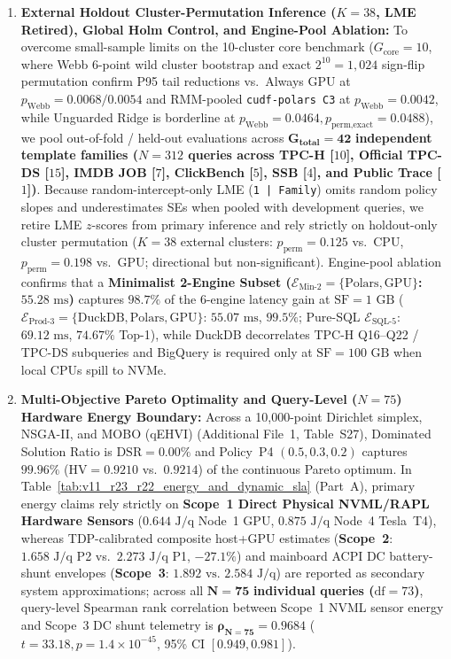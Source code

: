 \documentclass[10pt,a4paper]{article}
\begin{document}
\begin{enumerate}[leftmargin=1.5em,itemsep=1pt]
    \item \textbf{External Holdout Cluster-Permutation Inference ($K=38$, LME Retired), Global Holm Control, and Engine-Pool Ablation:} To overcome small-sample limits on the 10-cluster core benchmark ($G_{\text{core}}=10$, where Webb 6-point wild cluster bootstrap and exact $2^{10}=1{,}024$ sign-flip permutation confirm P95 tail reductions vs.\ Always GPU at $p_{\text{Webb}}=0.0068/0.0054$ and RMM-pooled \texttt{cudf-polars C3} at $p_{\text{Webb}}=0.0042$, while Unguarded Ridge is borderline at $p_{\text{Webb}}=0.0464, p_{\text{perm,exact}}=0.0488$), we pool out-of-fold / held-out evaluations across $\mathbf{G_{\text{total}}=42}$ \textbf{independent template families ($N=312$ queries across TPC-H [$10$], Official TPC-DS [$15$], IMDB JOB [$7$], ClickBench [$5$], SSB [$4$], and Public Trace [$1$])}. Because random-intercept-only LME (\texttt{1 | Family}) omits random policy slopes and underestimates SEs when pooled with development queries, we retire LME $z$-scores from primary inference and rely strictly on holdout-only cluster permutation ($K=38$ external clusters: $p_{\text{perm}} = 0.125$ vs.\ CPU, $p_{\text{perm}} = 0.198$ vs.\ GPU; directional but non-significant). Engine-pool ablation confirms that a \textbf{Minimalist 2-Engine Subset ($\mathcal{E}_{\text{Min-2}}=\{\text{Polars},\text{GPU}\}$: $55.28\text{ ms}$)} captures $\mathbf{98.7\%}$ of the 6-engine latency gain at $\text{SF}=1\text{ GB}$ ($\mathcal{E}_{\text{Prod-3}}=\{\text{DuckDB},\text{Polars},\text{GPU}\}$: $55.07\text{ ms}$, $99.5\%$; Pure-SQL $\mathcal{E}_{\text{SQL-5}}$: $69.12\text{ ms}$, $74.67\%$ Top-1), while DuckDB decorrelates TPC-H Q16--Q22 / TPC-DS subqueries and BigQuery is required only at $\text{SF}=100\text{ GB}$ when local CPUs spill to NVMe.
    \item \textbf{Multi-Objective Pareto Optimality and Query-Level ($N=75$) Hardware Energy Boundary:} Across a 10,000-point Dirichlet simplex, NSGA-II, and MOBO (qEHVI) (Additional File~1, Table~S27), Dominated Solution Ratio is $\text{DSR}=0.00\%$ and Policy~P4 $(0.5,0.3,0.2)$ captures $99.96\%$ ($\text{HV}=0.9210$ vs.\ $0.9214$) of the continuous Pareto optimum. In Table~\ref{tab:v11_r23_r22_energy_and_dynamic_sla} (Part~A), primary energy claims rely strictly on \textbf{Scope~1 Direct Physical NVML/RAPL Hardware Sensors} ($0.644\text{ J/q}$ Node~1 GPU, $0.875\text{ J/q}$ Node~4 Tesla~T4), whereas TDP-calibrated composite host+GPU estimates (\textbf{Scope~2}: $1.658\text{ J/q}$ P2 vs.\ $2.273\text{ J/q}$ P1, $-27.1\%$) and mainboard ACPI DC battery-shunt envelopes (\textbf{Scope~3}: $1.892\text{ vs.\ }2.584\text{ J/q}$) are reported as secondary system approximations; across all $\mathbf{N=75}$ \textbf{individual queries ($\text{df}=73$)}, query-level Spearman rank correlation between Scope~1 NVML sensor energy and Scope~3 DC shunt telemetry is $\mathbf{\rho_{N=75}=0.9684}$ ($t=33.18, p=1.4\times 10^{-45}$, 95\% CI $[0.949,0.981]$).

\end{enumerate}
\end{document}
